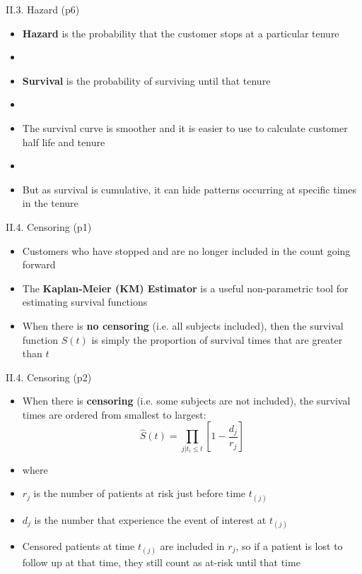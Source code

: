 \documentclass[handout]{beamer}
\newcommand{\strong}[1]{\textbf{\color{teal} #1}}
\newcommand{\stronger}[1]{\textbf{\color{purple} #1}}
\begin{document}
\begin{frame}{II.3. Hazard (p6)}
\begin{itemize}
\item \stronger{Hazard} is the probability that the customer stops at a particular tenure
\item[]
\item \stronger{Survival} is the probability of surviving until that tenure
\item[]
\item The survival curve is smoother and it is easier to use to calculate customer half life and tenure
\item[]
\item But as survival is cumulative, it can hide patterns occurring at specific times in the tenure
\end{itemize}
\end{frame}
\begin{frame}{II.4. Censoring (p1)}
\begin{itemize}
\item Customers who have stopped and are no longer included in the count going forward

\item The \stronger{Kaplan-Meier (KM) Estimator} is a useful non-parametric tool for estimating survival functions
\item When there is \strong{no censoring} (i.e. all subjects included), then the survival function $S(t)$ is simply the proportion of survival times that are greater than $t$
\end{itemize}
\end{frame}
\begin{frame}{II.4. Censoring (p2)}
\begin{itemize}
\item When there is \strong{censoring} (i.e. some subjects are not included), the survival times are ordered from smallest to largest:
\[
	\hat{S}(t)= \prod_{j|t_i \leq{t}} [1-\frac{d_j}{r_j}]
\]
\item[] where
\item[] $r_j$ is the number of patients at risk just before time $t_{(j)}$ 
\item[] $d_j$ is the number that experience the event of interest at $t_{(j)}$
\item Censored patients at time $t_{(j)}$ are included in $r_j$, so if a patient is lost to follow up at that time, they still count as at-risk until that time
\end{itemize}
\end{frame}
\end{document}
